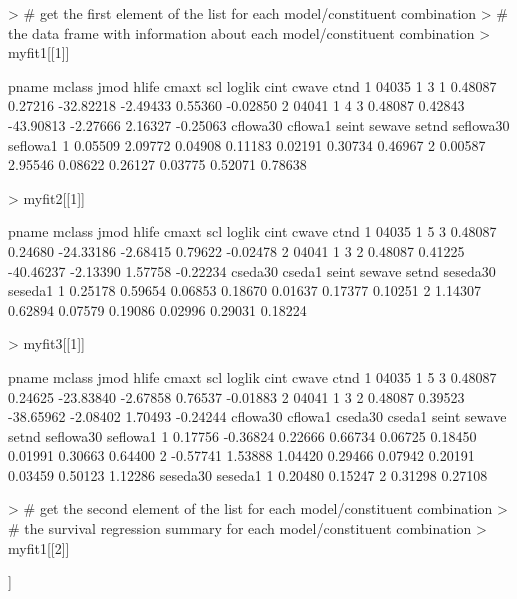 \documentclass[11pt]{article}
\begin{document}
\begin{Schunk}
\begin{Sinput}
> # get the first element of the list for each model/constituent combination
> # the data frame with information about each model/constituent combination
> myfit1[[1]]
\end{Sinput}
\begin{Soutput}
  pname mclass jmod hlife   cmaxt     scl    loglik     cint   cwave     ctnd
1 04035      1    3     1 0.48087 0.27216 -32.82218 -2.49433 0.55360 -0.02850
2 04041      1    4     3 0.48087 0.42843 -43.90813 -2.27666 2.16327 -0.25063
  cflowa30 cflowa1   seint  sewave   setnd seflowa30 seflowa1
1  0.05509 2.09772 0.04908 0.11183 0.02191   0.30734  0.46967
2  0.00587 2.95546 0.08622 0.26127 0.03775   0.52071  0.78638
\end{Soutput}
\begin{Sinput}
> myfit2[[1]]
\end{Sinput}
\begin{Soutput}
  pname mclass jmod hlife   cmaxt     scl    loglik     cint   cwave     ctnd
1 04035      1    5     3 0.48087 0.24680 -24.33186 -2.68415 0.79622 -0.02478
2 04041      1    3     2 0.48087 0.41225 -40.46237 -2.13390 1.57758 -0.22234
  cseda30  cseda1   seint  sewave   setnd seseda30 seseda1
1 0.25178 0.59654 0.06853 0.18670 0.01637  0.17377 0.10251
2 1.14307 0.62894 0.07579 0.19086 0.02996  0.29031 0.18224
\end{Soutput}
\begin{Sinput}
> myfit3[[1]]
\end{Sinput}
\begin{Soutput}
  pname mclass jmod hlife   cmaxt     scl    loglik     cint   cwave     ctnd
1 04035      1    5     3 0.48087 0.24625 -23.83840 -2.67858 0.76537 -0.01883
2 04041      1    3     2 0.48087 0.39523 -38.65962 -2.08402 1.70493 -0.24244
  cflowa30  cflowa1 cseda30  cseda1   seint  sewave   setnd seflowa30 seflowa1
1  0.17756 -0.36824 0.22666 0.66734 0.06725 0.18450 0.01991   0.30663  0.64400
2 -0.57741  1.53888 1.04420 0.29466 0.07942 0.20191 0.03459   0.50123  1.12286
  seseda30 seseda1
1  0.20480 0.15247
2  0.31298 0.27108
\end{Soutput}
\begin{Sinput}
> # get the second element of the list for each model/constituent combination
> # the survival regression summary for each model/constituent combination
> myfit1[[2]]
\end{Sinput}
\begin{Soutput}
[[1]]


\end{Soutput}
\end{Schunk}
\end{document}
